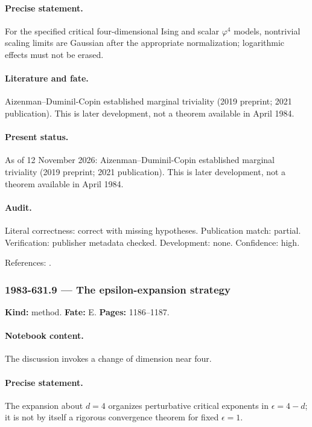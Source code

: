 \paragraph{Precise statement.} For the specified critical four-dimensional Ising and scalar \(\varphi^4\) models, nontrivial scaling limits are Gaussian after the appropriate normalization; logarithmic effects must not be erased.

\paragraph{Literature and fate.} Aizenman--Duminil-Copin established marginal triviality (2019 preprint; 2021 publication). This is later development, not a theorem available in April 1984.

\paragraph{Present status.} As of 12 November 2026: Aizenman--Duminil-Copin established marginal triviality (2019 preprint; 2021 publication). This is later development, not a theorem available in April 1984.

\paragraph{Audit.} Literal correctness: correct with missing hypotheses. Publication match: partial. Verification: publisher metadata checked. Development: none. Confidence: high.

\noindent References: \citep{aizenmanduminilcopin2021marginal}.\par

\subsubsection{1983-631.9 --- The epsilon-expansion strategy}

\label{item:1983-631.9}

\noindent\textbf{Kind:} method. \textbf{Fate:} E. \textbf{Pages:} 1186--1187.\par

\paragraph{Notebook content.} The discussion invokes a change of dimension near four.

\paragraph{Precise statement.} The expansion about \(d=4\) organizes perturbative critical exponents in \(\epsilon=4-d\); it is not by itself a rigorous convergence theorem for fixed \(\epsilon=1\).


